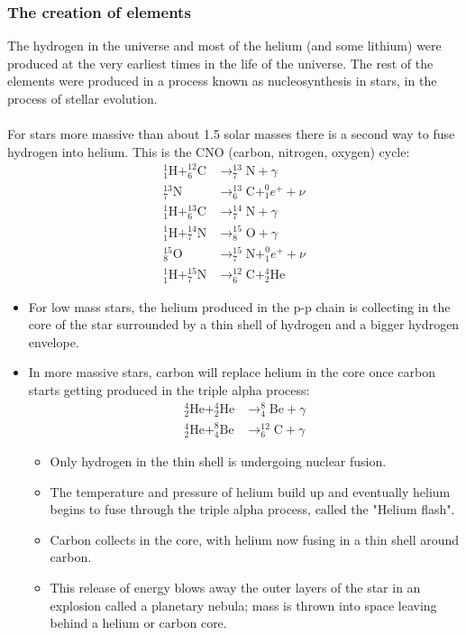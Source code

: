 \documentclass[a4paper,12pt]{article}
\begin{document}
\subsubsection*{The creation of elements}
The hydrogen in the universe and most of the helium (and some lithium) were produced at the very earliest times in the life of the universe. The rest of the elements were produced in a process known as nucleosynthesis in stars, in the process of stellar evolution.\\\\
For stars more massive than about 1.5 solar masses there is a second way to fuse hydrogen into helium. This is the CNO (carbon, nitrogen, oxygen) cycle:
\[\begin{aligned}
^1_1\text{H}+^{12}_6\text{C}&\rightarrow ^{13}_7\text{N}+\gamma\\
^{13}_7\text{N}&\rightarrow ^{13}_6\text{C}+^0_1e^++\nu\\
^1_1\text{H}+^{13}_6\text{C}&\rightarrow ^{14}_7\text{N}+\gamma\\
^1_1\text{H}+^{14}_7\text{N}&\rightarrow ^{15}_8\text{O}+\gamma\\
^{15}_8\text{O}&\rightarrow ^{15}_7\text{N}+^0_1e^++\nu\\
^1_1\text{H}+^{15}_7\text{N}&\rightarrow ^{12}_6\text{C}+^4_2\text{He}
\end{aligned}\]
\begin{itemize}
  \item For low mass stars, the helium produced in the p-p chain is collecting in the core of the star surrounded by a thin shell of hydrogen and a bigger hydrogen envelope.
  \item In more massive stars, carbon will replace helium in the core once carbon starts getting produced in the triple alpha process:
  \[
  \begin{aligned}
  ^4_2\text{He}+^4_2\text{He}&\rightarrow ^8_4\text{Be} + \gamma \\
  ^4_2\text{He}+^8_4\text{Be}&\rightarrow ^{12}_6\text{C} + \gamma
  \end{aligned}
  \]
  \begin{itemize}
    \item Only hydrogen in the thin shell is undergoing nuclear fusion. 
    \item The temperature and pressure of helium build up and eventually helium begins to fuse through the triple alpha process, called the "Helium flash".
    \item Carbon collects in the core, with helium now fusing in a thin shell around carbon.
    \item This release of energy blows away the outer layers of the star in an explosion called a planetary nebula; mass is thrown into space leaving behind a helium or carbon core.
  \end{itemize}
\end{itemize}
\end{document}

